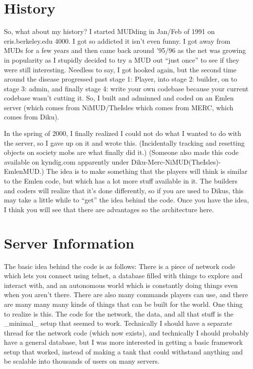\section{History} 

So, what about my history? I started MUDding in Jan/Feb of 1991 on
eris.berkeley.edu 4000. I got so addicted it isn't even funny. I got
away from MUDs for a few years and then came back around '95/96 as the
net was growing in popularity as I stupidly decided to try a MUD out
``just once'' to see if they were still interesting. Needless to say,
I got hooked again, but the second time around the disease progressed
past stage 1: Player, into stage 2: builder, on to stage 3: admin, and
finally stage 4: write your own codebase because your current codebase
wasn't cutting it. So, I built and adminned and coded on an Emlen
server (which comes from NiMUD/TheIsles which comes from MERC, which
comes from Diku).

In the spring of 2000, I finally realized I could not do what I wanted
to do with the server, so I gave up on it and wrote
this. (Incidentally tracking and resetting objects on society mobs are
what finally did it.) (Someone also made this code available on
kyndig.com apparently under Diku-Merc-NiMUD(TheIsles)-EmlenMUD.)
The idea is to make something that the players
will think is similar to the Emlen code, but which has a lot more
stuff available in it. The builders and coders will realize that it's
done differently, so if you are used to Dikus, this may take a little
while to ``get'' the idea behind the code. Once you have the idea, I
think you will see that there are advantages so the architecture here.

\section{Server Information}

The basic idea behind the code is as follows: There is a piece of network code
which lets you connect using telnet, a database filled with things to explore
and interact with, and an autonomous world which is constantly doing things
even when you aren't there. There are also many commands players can use, and
there are many many many kinds of things that can be built for the world. One
thing to realize is this. The code for the network, the data, and all that
stuff is the \_minimal\_ setup that seemed to work. Technically I should have
a separate thread for the network code (which now exists), and technically I
should probably have a general database, but I was more interested in getting
a basic framework setup that worked, instead of making a tank that could
withstand anything and be scalable into thousands of users on many servers.


